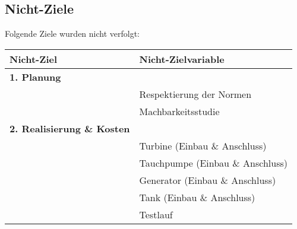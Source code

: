 \subsection{Nicht-Ziele}
Folgende Ziele wurden nicht verfolgt:
\begin{table}
\begin{tabular}{ll}
\textbf{Nicht-Ziel}						&\textbf{Nicht-Zielvariable}											\\
\hline
\rowcolor{grau}
\textbf{1. Planung}						&																	\\
										&Respektierung der Normen											\\
										&Machbarkeitsstudie													\\
\rowcolor{grau}
\textbf{2. Realisierung \& Kosten}		&																	\\
										&Turbine	 (Einbau \& Anschluss)										\\
										&Tauchpumpe (Einbau \& Anschluss)									\\
										&Generator (Einbau \& Anschluss)										\\
										&Tank (Einbau \& Anschluss)											\\
										&Testlauf															\\		
\hline
\end{tabular}
\end{table}